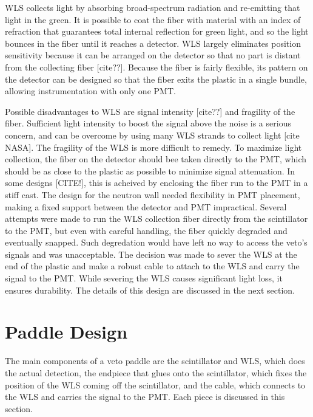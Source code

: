 WLS collects light by absorbing broad-spectrum radiation and re-emitting that light in the green.  It is possible to coat the fiber with material with an index of refraction that guarantees total internal reflection for green light, and so the light bounces in the fiber until it reaches a detector.  WLS largely eliminates position sensitivity because it can be arranged on the detector so that no part is distant from the collecting fiber [cite??].  Because the fiber is fairly flexible, its pattern on the detector can be designed so that the fiber exits the plastic in a single bundle, allowing instrumentation with only one PMT.

Possible disadvantages to WLS are signal intensity [cite??] and fragility of the fiber.  Sufficient light intensity to boost the signal above the noise is a serious concern, and can be overcome by using many WLS strands to collect light [cite NASA].  The fragility of the WLS is more difficult to remedy.  To maximize light collection, the fiber on the detector should bee taken directly to the PMT, which should be as close to the plastic as possible to minimize signal attenuation.  In some designs [CITE!], this is acheived by enclosing the fiber run to the PMT in a stiff cast.  The design for the neutron wall needed flexibility in PMT placement, making a fixed support between the detector and PMT impractical.  Several attempts were made to run the WLS collection fiber directly from the scintillator to the PMT, but even with careful handling, the fiber quickly degraded and eventually snapped.  Such degredation would have left no way to access the veto's signals and was unacceptable.  The decision was made to sever the WLS at the end of the plastic and make a robust cable to attach to the WLS and carry the signal to the PMT.  While severing the WLS causes significant light loss, it ensures durability.  The details of this design are discussed in the next section.  

\section{Paddle Design}

The main components of a veto paddle are the scintillator and WLS, which does the actual detection, the endpiece that glues onto the scintillator, which fixes the position of the WLS coming off the scintillator, and the cable, which connects to the WLS and carries the signal to the PMT.  Each piece is discussed in this section.

